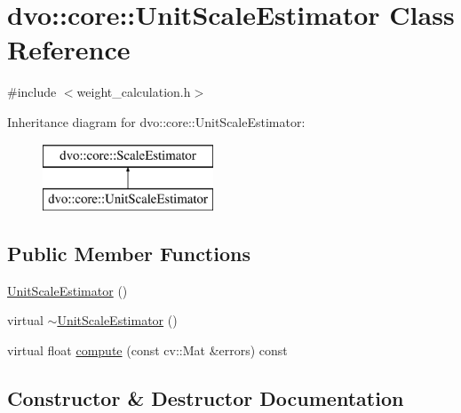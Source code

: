 \hypertarget{classdvo_1_1core_1_1_unit_scale_estimator}{}\section{dvo\+:\+:core\+:\+:Unit\+Scale\+Estimator Class Reference}
\label{classdvo_1_1core_1_1_unit_scale_estimator}


{\ttfamily \#include $<$weight\+\_\+calculation.\+h$>$}

Inheritance diagram for dvo\+:\+:core\+:\+:Unit\+Scale\+Estimator\+:\begin{figure}[H]
\begin{center}
\leavevmode
\includegraphics[height=2.000000cm]{classdvo_1_1core_1_1_unit_scale_estimator}
\end{center}
\end{figure}
\subsection*{Public Member Functions}
\begin{DoxyCompactItemize}
\item 
\mbox{\hyperlink{classdvo_1_1core_1_1_unit_scale_estimator_a848f562d555626a06004987f03f0bc32}{Unit\+Scale\+Estimator}} ()
\item 
virtual \mbox{\hyperlink{classdvo_1_1core_1_1_unit_scale_estimator_ab3314993ec55499d0693ce7310e13de9}{$\sim$\+Unit\+Scale\+Estimator}} ()
\item 
virtual float \mbox{\hyperlink{classdvo_1_1core_1_1_unit_scale_estimator_a7578f9008f25d96250c20ff3080673ed}{compute}} (const cv\+::\+Mat \&errors) const
\end{DoxyCompactItemize}


\subsection{Constructor \& Destructor Documentation}
\mbox{\label{classdvo_1_1core_1_1_unit_scale_estimator_a848f562d555626a06004987f03f0bc32}} 
